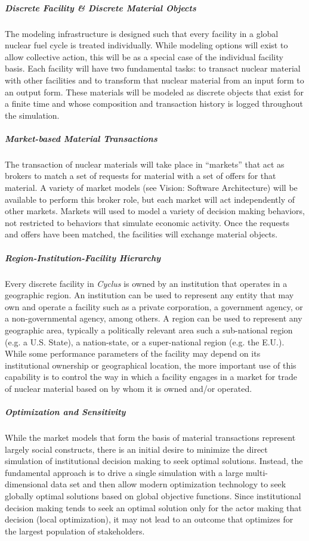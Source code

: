 \documentclass[letterpaper,10pt,english]{sphinxmanual}
\begin{document}
\subparagraph{Discrete Facility \& Discrete Material Objects}
\label{basics/introduction:discrete-facility-discrete-material-objects}
The modeling infrastructure is designed such that every facility in a global
nuclear fuel cycle is treated individually.  While modeling options will exist
to allow collective action, this will be as a special case of the individual
facility basis.  Each facility will have two fundamental tasks: to transact
nuclear material with other facilities and to transform that nuclear material
from an input form to an output form.  These materials will be modeled as
discrete objects that exist for a finite time and whose composition and
transaction history is logged throughout the simulation.


\subparagraph{Market-based Material Transactions}
\label{basics/introduction:market-based-material-transactions}
The transaction of nuclear materials will take place in ``markets'' that act as
brokers to match a set of requests for material with a set of offers for that
material.  A variety of market models (see Vision: Software Architecture) will
be available to perform this broker role, but each market will act
independently of other markets.  Markets will used to model a variety of
decision making behaviors, not restricted to behaviors that simulate economic
activity.  Once the requests and offers have been matched, the facilities will
exchange material objects.


\subparagraph{Region-Institution-Facility Hierarchy}
\label{basics/introduction:region-institution-facility-hierarchy}
Every discrete facility in \emph{Cyclus} is owned by an institution that operates in
a geographic region.  An institution can be used to represent any entity that
may own and operate a facility such as a private corporation, a government
agency, or a non-governmental agency, among others.  A region can be used to
represent any geographic area, typically a politically relevant area such a
sub-national region (e.g. a U.S. State), a nation-state, or a super-national
region (e.g. the E.U.).  While some performance parameters of the facility may
depend on its institutional ownership or geographical location, the more
important use of this capability is to control the way in which a facility
engages in a market for trade of nuclear material based on by whom it is owned
and/or operated.


\subparagraph{Optimization and Sensitivity}
\label{basics/introduction:optimization-and-sensitivity}
While the market models that form the basis of material transactions represent
largely social constructs, there is an initial desire to minimize the direct
simulation of institutional decision making to seek optimal solutions.
Instead, the fundamental approach is to drive a single simulation with a large
multi-dimensional data set and then allow modern optimization technology to
seek globally optimal solutions based on global objective functions.  Since
institutional decision making tends to seek an optimal solution only for the
actor making that decision (local optimization), it may not lead to an outcome
that optimizes for the largest population of stakeholders.
\end{document}
